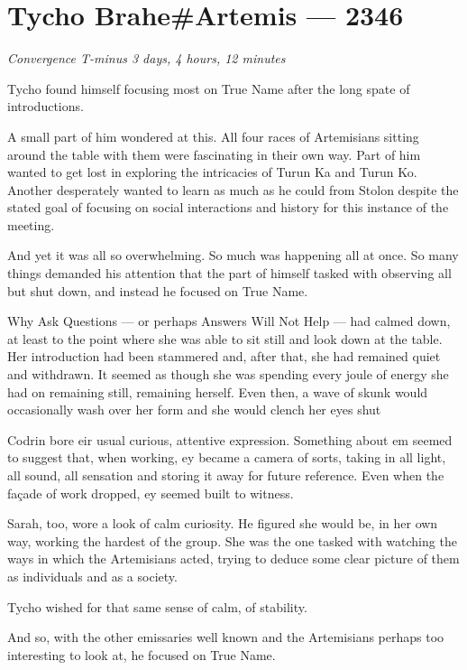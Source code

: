 \hypertarget{tycho-braheartemis-2346}{%
\chapter{Tycho Brahe\#Artemis — 2346}\label{tycho-braheartemis-2346}}

\begin{center}
\emph{Convergence T-minus 3 days, 4 hours, 12 minutes}
\end{center}

\noindent Tycho found himself focusing most on True Name after the long spate of introductions.

A small part of him wondered at this. All four races of Artemisians sitting around the table with them were fascinating in their own way. Part of him wanted to get lost in exploring the intricacies of Turun Ka and Turun Ko. Another desperately wanted to learn as much as he could from Stolon despite the stated goal of focusing on social interactions and history for this instance of the meeting.

And yet it was all so overwhelming. So much was happening all at once. So many things demanded his attention that the part of himself tasked with observing all but shut down, and instead he focused on True Name.

Why Ask Questions — or perhaps Answers Will Not Help — had calmed down, at least to the point where she was able to sit still and look down at the table. Her introduction had been stammered and, after that, she had remained quiet and withdrawn. It seemed as though she was spending every joule of energy she had on remaining still, remaining herself. Even then, a wave of skunk would occasionally wash over her form and she would clench her eyes shut

Codrin bore eir usual curious, attentive expression. Something about em seemed to suggest that, when working, ey became a camera of sorts, taking in all light, all sound, all sensation and storing it away for future reference. Even when the façade of work dropped, ey seemed built to witness.

Sarah, too, wore a look of calm curiosity. He figured she would be, in her own way, working the hardest of the group. She was the one tasked with watching the ways in which the Artemisians acted, trying to deduce some clear picture of them as individuals and as a society.

Tycho wished for that same sense of calm, of stability.

And so, with the other emissaries well known and the Artemisians perhaps too interesting to look at, he focused on True Name.

